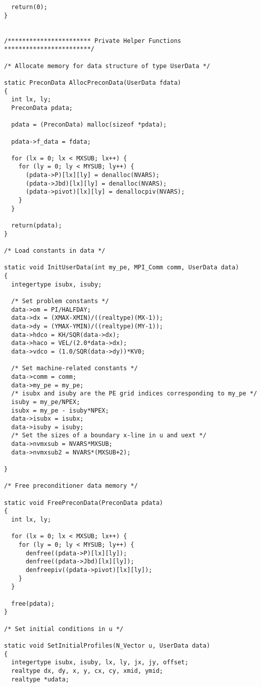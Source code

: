\begin{verbatim}
  return(0);
}


/*********************** Private Helper Functions ************************/

/* Allocate memory for data structure of type UserData */

static PreconData AllocPreconData(UserData fdata)
{
  int lx, ly;
  PreconData pdata;

  pdata = (PreconData) malloc(sizeof *pdata);

  pdata->f_data = fdata;

  for (lx = 0; lx < MXSUB; lx++) {
    for (ly = 0; ly < MYSUB; ly++) {
      (pdata->P)[lx][ly] = denalloc(NVARS);
      (pdata->Jbd)[lx][ly] = denalloc(NVARS);
      (pdata->pivot)[lx][ly] = denallocpiv(NVARS);
    }
  }

  return(pdata);
}

/* Load constants in data */

static void InitUserData(int my_pe, MPI_Comm comm, UserData data)
{
  integertype isubx, isuby;

  /* Set problem constants */
  data->om = PI/HALFDAY;
  data->dx = (XMAX-XMIN)/((realtype)(MX-1));
  data->dy = (YMAX-YMIN)/((realtype)(MY-1));
  data->hdco = KH/SQR(data->dx);
  data->haco = VEL/(2.0*data->dx);
  data->vdco = (1.0/SQR(data->dy))*KV0;

  /* Set machine-related constants */
  data->comm = comm;
  data->my_pe = my_pe;
  /* isubx and isuby are the PE grid indices corresponding to my_pe */
  isuby = my_pe/NPEX;
  isubx = my_pe - isuby*NPEX;
  data->isubx = isubx;
  data->isuby = isuby;
  /* Set the sizes of a boundary x-line in u and uext */
  data->nvmxsub = NVARS*MXSUB;
  data->nvmxsub2 = NVARS*(MXSUB+2);

}

/* Free preconditioner data memory */

static void FreePreconData(PreconData pdata)
{
  int lx, ly;

  for (lx = 0; lx < MXSUB; lx++) {
    for (ly = 0; ly < MYSUB; ly++) {
      denfree((pdata->P)[lx][ly]);
      denfree((pdata->Jbd)[lx][ly]);
      denfreepiv((pdata->pivot)[lx][ly]);
    }
  }

  free(pdata);
}

/* Set initial conditions in u */

static void SetInitialProfiles(N_Vector u, UserData data)
{
  integertype isubx, isuby, lx, ly, jx, jy, offset;
  realtype dx, dy, x, y, cx, cy, xmid, ymid;
  realtype *udata;


\end{verbatim}
